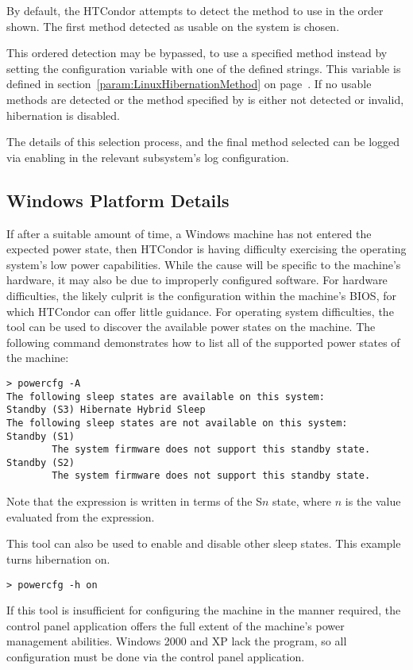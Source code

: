 By default, the HTCondor attempts to detect the method
to use in the order shown.  The first method detected as usable
on the system is chosen.

This ordered detection may be bypassed,
to use a specified method instead by setting the configuration
variable  with
one of the defined strings.
This variable is defined in 
section~\ref{param:LinuxHibernationMethod} on
page~\pageref{param:LinuxHibernationMethod}.
If no usable methods are detected or the method specified by
 is either not detected or invalid,
hibernation is disabled.

The details of this selection process, and the final method selected
can be logged via enabling  in the relevant
subsystem's log configuration.


\subsection{Windows Platform Details}

If after a suitable amount of time,
a Windows machine has not entered the expected power state,
then HTCondor is having difficulty exercising the operating system's
low power capabilities.  
While the cause will be specific to the machine's hardware,
it may also be due to improperly configured software.  
For hardware difficulties,
the likely culprit is the configuration within the machine's BIOS,
for which HTCondor can offer little guidance.
For operating system difficulties,
the  tool can be used to discover the available 
power states on the machine.
The following command demonstrates how to
list all of the supported power states of the machine:

\begin{verbatim}
> powercfg -A
The following sleep states are available on this system: 
Standby (S3) Hibernate Hybrid Sleep
The following sleep states are not available on this system:
Standby (S1)
        The system firmware does not support this standby state.
Standby (S2)
        The system firmware does not support this standby state.
\end{verbatim}

Note that the  expression is written in terms of the 
S$n$ state, where $n$ is the value evaluated from the expression.

This tool can also be used to enable and disable other sleep states.
This example turns hibernation on.

\begin{verbatim}
> powercfg -h on
\end{verbatim}

If this tool is insufficient for configuring the machine in the manner required,
the  control panel application offers
the full extent of the machine's power management abilities.
Windows 2000 and XP lack the  program,
so all configuration must be done via the 
control panel application.

